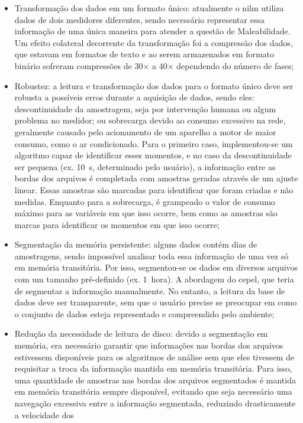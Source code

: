\begin{itemize}
\item Transformação dos dados em um formato único: atualmente o
\gls{nilm} utiliza dados de dois medidores diferentes, sendo
necessário representar essa informação de uma única maneira para
atender a questão de Maleabilidade. Um efeito colateral decorrente da
transformação foi a compressão dos dados, que estavam em formatos de
texto e ao serem armazenados em formato binário sofreram compressões de
30$\times$ a 40$\times$ dependendo do número de fases;
\item Robustez: a leitura e transformação dos dados para o formato
único deve ser robusta a possíveis erros durante a aquisição de dados,
sendo eles: descontinuidade da amostragem, seja por intervenção humana
ou algum problema no medidor; ou sobrecarga devido ao consumo
excessivo na rede, geralmente causado pelo acionamento de um aparelho
a motor de maior consumo, como o ar condicionado. Para o primeiro
caso, implementou-se um algoritmo capaz de identificar esses momentos,
e no caso da descontinuidade ser pequena (ex. 10~s, determinado pelo
usuário), a informação entre as bordas dos arquivos é completada com
amostras geradas através de um ajuste linear. Essas amostras são
marcadas para identificar que foram criadas e não medidas. Enquanto
para a sobrecarga, é grampeado o valor de consumo máximo para as
variáveis em que isso ocorre, bem como as amostras são marcas para
identificar os momentos em que isso ocorre;
\item Segmentação da memória persistente: alguns dados contém dias de
amostragens, sendo impossível analisar toda essa informação de uma vez
só em memória transitória. Por isso, segmentou-se os dados em diversos
arquivos com um tamanho pré-definido (ex. 1~hora). A abordagem do
\acs{cepel}, que teria de segmentar a informação manualmente. No
entanto, a leitura da base de dados deve ser transparente, sem que o
usuário precise se preocupar em como o conjunto de dados esteja
representado e compreendido pelo ambiente;
\item Redução da necessidade de leitura de disco: devido a segmentação
em memória, era necessário garantir que informações nas bordas dos
arquivos estivessem disponíveis para os algoritmos de análise sem que
eles tivessem de requisitar a troca da informação mantida em memória
transitória. Para isso, uma quantidade de amostras nas bordas dos
arquivos segmentados é mantida em memória transitória sempre
disponível, evitando que seja necessário uma navegação excessiva entre
a informação segmentada, reduzindo drasticamente a velocidade dos

\end{itemize}
